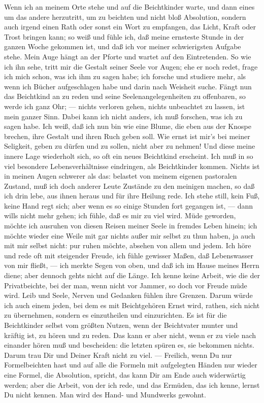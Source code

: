 Wenn ich an meinem Orte stehe und auf die Beichtkinder warte, und dann eines um das andere herzutritt, um zu beichten und nicht bloß Absolution, sondern auch irgend einen Rath oder sonst ein Wort zu empfangen, das Licht, Kraft oder Trost bringen kann; so weiß und fühle ich, daß meine ernsteste Stunde in der ganzen Woche gekommen ist, und daß ich vor meiner schwierigsten Aufgabe stehe. Mein Auge hängt an der Pforte und wartet auf den Eintretenden. So wie ich ihn sehe, tritt mir die Gestalt seiner Seele vor Augen; ehe er noch redet, frage ich mich schon, was ich ihm zu sagen habe; ich forsche und studiere mehr, als wenn ich Bücher aufgeschlagen habe und darin nach Weisheit suche. Fängt nun das Beichtkind an zu reden und seine Seelenangelegenheiten zu offenbaren, so werde ich ganz Ohr; — nichts verloren gehen, nichts unbeachtet zu lassen, ist mein ganzer Sinn. Dabei kann ich nicht anders, ich muß forschen, was ich zu sagen habe. Ich weiß, daß ich nun bin wie eine Blume, die eben aus der Knospe brechen, ihre Gestalt und ihren Ruch geben soll. Wie ernst ist mir's bei meiner Seligkeit, geben zu dürfen und zu sollen, nicht aber zu nehmen! Und diese meine innere Lage wiederholt sich, so oft ein neues Beichtkind erscheint. Ich muß in so viel besondere
Lebensverhältnisse eindringen, als Beichtkinder kommen. Nichts ist in meinen Augen schwerer als das: belastet von meinem eigenen pastoralen Zustand, muß ich doch anderer Leute Zustände zu den meinigen machen, so daß ich drin lebe, aus ihnen heraus und für ihre Heilung rede. Ich stehe still, kein Fuß, keine Hand regt sich; aber wenn es so einige Stunden fort gegangen ist, — dann wills nicht mehr gehen; ich fühle, daß es mir zu viel wird. Müde geworden, möchte ich ausruhen von diesen Reisen meiner Seele in fremdes Leben hinein; ich möchte wieder eine Weile mit gar nichts außer mir selbst zu thun haben, ja auch mit mir selbst nicht: pur ruhen möchte, absehen von allem und jedem. Ich höre und rede oft mit steigender Freude, ich fühle gewisser Maßen, daß Lebenswasser von mir fließt, — ich merkte Segen von oben, und daß ich im Hause meines Herrn diene; aber dennoch gehts nicht auf die Länge. Ich kenne keine Arbeit, wie die der Privatbeichte, bei der man, wenn nicht vor Jammer, so doch vor Freude müde wird. Leib und Seele, Nerven und Gedanken fühlen ihre Grenzen. Darum würde ich auch einem jeden, bei dem es mit Beichtgehören Ernst wird, rathen, sich nicht zu übernehmen, sondern es einzutheilen und einzurichten. Es ist für die Beichtkinder selbst vom größten Nutzen, wenn der Beichtvater munter und kräftig ist, zu hören und zu reden. Das kann er aber nicht, wenn er zu viele nach einander hören muß und bescheiden: die letzten spüren es, sie bekommen nichts. Darum trau Dir und Deiner Kraft nicht zu viel. — Freilich, wenn Du nur Formelbeichten hast und auf alle die Formeln mit aufgelegten Händen nur wieder eine
Formel, die Absolution, spricht, das kann Dir am Ende auch widerwärtig werden; aber die Arbeit, von der ich rede, und das Ermüden, das ich kenne, lernst Du nicht kennen. Man wird des Hand- und Mundwerks gewohnt.

